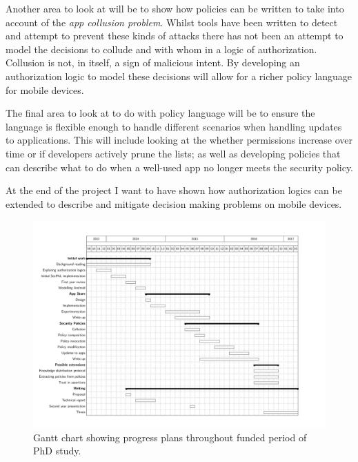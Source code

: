 \documentclass[a4paper,sfsidenotes]{tufte-book}
\begin{document}
Another area to look at will be to show how policies can be written to take into
account of the \emph{app collusion problem}.  Whilst tools have been written to
detect and attempt to prevent these kinds of attacks there has not been an
attempt to model the decisions to collude and with whom in a logic of
authorization.  Collusion is not, in itself, a sign of malicious intent.  By
developing an authorization logic to model these decisions will allow for a
richer policy language for mobile devices.

The final area to look at to do with policy language will be to ensure the language
is flexible enough to handle different scenarios when handling updates to
applications.  This will include looking at the whether permissions increase
over time or if developers actively prune the lists; as well as developing
policies that can describe what to do when a well-used app no longer meets the
security policy.


At the end of the project I want to have shown how authorization logics can be
extended to describe and mitigate decision making problems on mobile devices.

\begin{figure}\label{fig:gantt}
  \includegraphics[width=1.4\linewidth,angle=90]{gantt.pdf}
  \caption{Gantt chart showing progress plans throughout funded period of PhD
  study.}
\end{figure}



\appendix

\end{document}
